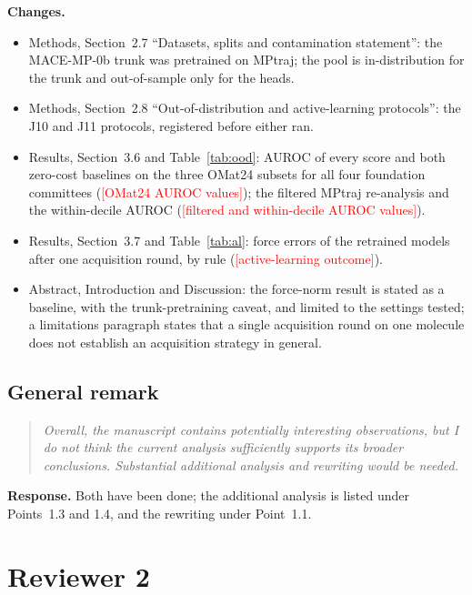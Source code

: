 \documentclass[11pt]{article}
\providecommand{\fsTODO}[1]{\textcolor{red}{[#1]}}
\newcommand{\rpoint}[1]{\begin{quote}\itshape #1\end{quote}}
\newcommand{\response}{\medskip\noindent\textbf{Response.} }
\newcommand{\changes}{\medskip\noindent\textbf{Changes.}}
\begin{document}
\changes
\begin{itemize}
\item Methods, Section~2.7 ``Datasets, splits and contamination statement'':
  the MACE-MP-0b trunk was pretrained on MPtraj; the pool is in-distribution
  for the trunk and out-of-sample only for the heads.
\item Methods, Section~2.8 ``Out-of-distribution and active-learning
  protocols'': the J10 and J11 protocols, registered before either ran.
\item Results, Section~3.6 and Table~\ref{tab:ood}: AUROC of every score and
  both zero-cost baselines on the three OMat24 subsets for all four foundation
  committees (\fsTODO{OMat24 AUROC values}); the filtered MPtraj re-analysis
  and the within-decile AUROC (\fsTODO{filtered and within-decile AUROC
  values}).
\item Results, Section~3.7 and Table~\ref{tab:al}: force errors of the
  retrained models after one acquisition round, by rule
  (\fsTODO{active-learning outcome}).
\item Abstract, Introduction and Discussion: the force-norm result is stated
  as a baseline, with the trunk-pretraining caveat, and limited to the
  settings tested; a limitations paragraph states that a single acquisition
  round on one molecule does not establish an acquisition strategy in general.
\end{itemize}

\subsection*{General remark}
\rpoint{Overall, the manuscript contains potentially interesting
observations, but I do not think the current analysis sufficiently supports
its broader conclusions. Substantial additional analysis and rewriting would
be needed.}

\response
Both have been done; the additional analysis is listed under Points~1.3 and
1.4, and the rewriting under Point~1.1.

\section*{Reviewer 2}
\end{document}
